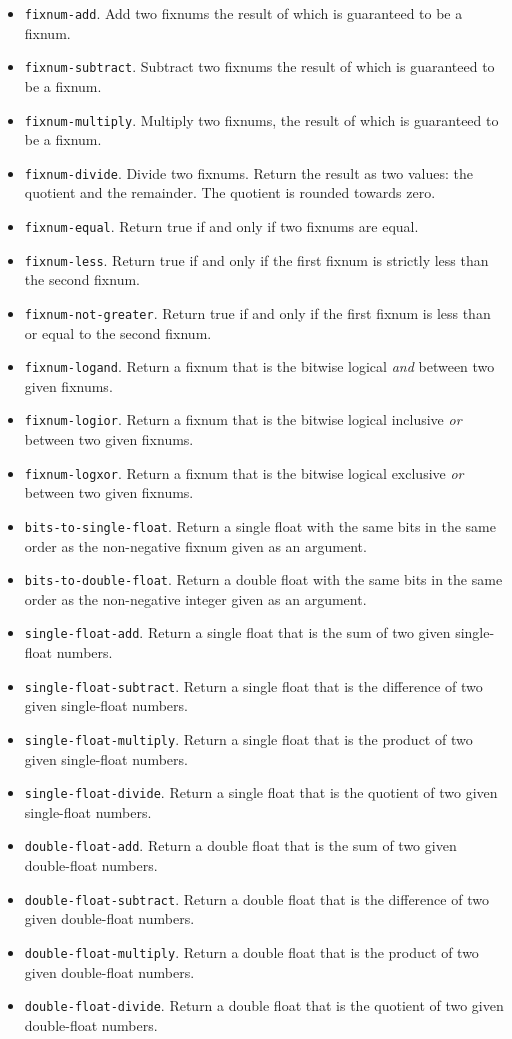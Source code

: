 \begin{itemize}
\item \texttt{fixnum-add}.  Add two fixnums the result of which is
  guaranteed to be a fixnum.
\item \texttt{fixnum-subtract}.  Subtract two fixnums the result of
  which is guaranteed to be a fixnum.
\item \texttt{fixnum-multiply}.  Multiply two fixnums, the result of
  which is guaranteed to be a fixnum.
\item \texttt{fixnum-divide}.  Divide two fixnums.  Return the result
  as two values: the quotient and the remainder.  The quotient is
  rounded towards zero.
\item \texttt{fixnum-equal}.  Return true if and only if two fixnums
  are equal.
\item \texttt{fixnum-less}.  Return true if and only if the first
  fixnum is strictly less than the second fixnum.
\item \texttt{fixnum-not-greater}.  Return true if and only if the first
  fixnum is less than or equal to the second fixnum.
\item \texttt{fixnum-logand}.  Return a fixnum that is the bitwise
  logical \emph{and} between two given fixnums.
\item \texttt{fixnum-logior}.  Return a fixnum that is the bitwise
  logical inclusive \emph{or} between two given fixnums.
\item \texttt{fixnum-logxor}.  Return a fixnum that is the bitwise
  logical exclusive \emph{or} between two given fixnums.
\item \texttt{bits-to-single-float}.  Return a single float with the
  same bits in the same order as the non-negative fixnum given as an
  argument.
\item \texttt{bits-to-double-float}.  Return a double float with the
  same bits in the same order as the non-negative integer given as an
  argument.
\item \texttt{single-float-add}.  Return a single float that is the
  sum of two given single-float numbers.
\item \texttt{single-float-subtract}.  Return a single float that is
  the difference of two given single-float numbers.
\item \texttt{single-float-multiply}.  Return a single float that is
  the product of two given single-float numbers.
\item \texttt{single-float-divide}.  Return a single float that is
  the quotient of two given single-float numbers.
\item \texttt{double-float-add}.  Return a double float that is the
  sum of two given double-float numbers.
\item \texttt{double-float-subtract}.  Return a double float that is
  the difference of two given double-float numbers.
\item \texttt{double-float-multiply}.  Return a double float that is
  the product of two given double-float numbers.
\item \texttt{double-float-divide}.  Return a double float that is
  the quotient of two given double-float numbers.
\end{itemize}


